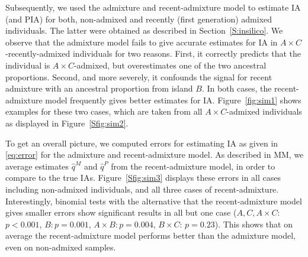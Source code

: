 \documentclass[12pt]{article}
\theoremstyle{definition}
\begin{document}
Subsequently, we used the admixture and recent-admixture model to
estimate IA (and PIA) for both, non-admixed and recently (first
generation) admixed individuals. The latter were obtained as described
in Section~\ref{S:insilico}. We observe that the admixture model fails
to give accurate estimates for IA in $A\times C$-recently-admixed
individuals for two reasons. First, it correctly predicts that the
individual is $A\times C$-admixed, but overestimates one of the two
ancestral proportions. Second, and more severely, it confounds the
signal for recent admixture with an ancestral proportion from island
$B$. In both cases, the recent-admixture model frequently gives better
estimates for IA. Figure~\ref{fig:sim1} shows examples for these two
cases, which are taken from all $A\times C$-admixed individuals as
displayed in Figure~\ref{Sfig:sim2}.

To get an overall picture, we computed errors for estimating IA as
given in \eqref{eq:error} for the admixture and recent-admixture
model. As described in MM, we average estimates $\hat q^M$ and
$\hat q^P$ from the recent-admixture model, in order to compare to the
true IAs. Figure~\ref{Sfig:sim3} displays these errors in all cases
including non-admixed individuals, and all three cases of
recent-admixture. Interestingly, binomial tests with the alternative
that the recent-admixture model gives smaller errors show significant
results in all but one case ($A, C, A\times C$: $p<0.001$,
$B: p=0.001$, $A\times B: p=0.004$, $B\times C$: $p=0.23$). This shows
that on average the recent-admixture model performs better than the
admixture model, even on non-admixed samples.
\end{document}
